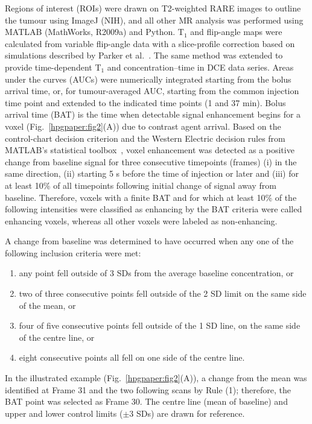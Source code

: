 Regions of interest (ROIs) were drawn on T2-weighted RARE images to outline the tumour using ImageJ (NIH), and all other MR analysis was performed using MATLAB (MathWorks, R2009a) and Python.
T$_1$ and flip-angle maps were calculated from variable flip-angle data with a slice-profile correction based on simulations described by Parker et al.~\cite{Parker:2001wj}.
The same method was extended to provide time-dependent T$_1$ and concentration–time in DCE data series.
Areas under the curves (AUCs) were numerically integrated starting from the bolus arrival time, or, for tumour-averaged AUC, starting from the common injection time point and extended to the indicated time points (1 and 37 min).
Bolus arrival time (BAT) is the time when detectable signal enhancement begins for a voxel (Fig.~\ref{hpgpaper:fig2}(A)) due to contrast agent arrival.
Based on the control-chart decision criterion and the Western Electric decision rules from MATLAB’s statistical toolbox~\cite{Shewhart:1931tq}, voxel enhancement was detected as a positive change from baseline signal for three consecutive timepoints (frames) (i) in the same direction, (ii) starting 5 s before the time of injection or later and (iii) for at least 10\% of all timepoints following initial change of signal away from baseline.
Therefore, voxels with a finite BAT and for which at least 10\% of the following intensities were classified as enhancing by the BAT criteria were called enhancing voxels, whereas all other voxels were labeled as non-enhancing.

A change from baseline was determined to have occurred
when any one of the following inclusion criteria were met:

\begin{enumerate}
	\item any point fell outside of 3 SDs from the average baseline concentration, or
	\item two of three consecutive points fell outside of the 2 SD limit on the same side of the mean, or
	\item four of five consecutive points fell outside of the 1 SD line, on the same side of the centre line, or
	\item eight consecutive points all fell on one side of the centre line.
\end{enumerate}

In the illustrated example (Fig.~\ref{hpgpaper:fig2}(A)), a change from the mean was identified at Frame 31 and the two following scans by Rule (1); therefore, the BAT point was selected as Frame 30.
The centre line (mean of baseline) and upper and lower control limits ($\pm$3 SDs) are drawn for reference.

